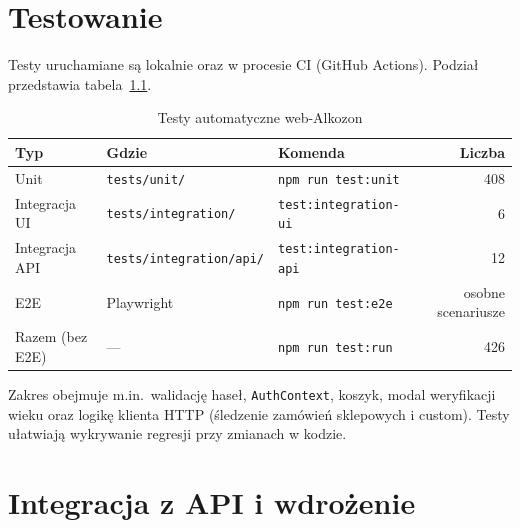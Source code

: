 \documentclass[12pt,a4paper]{report}
\newcommand{\blok}[1]{\needspace{9\baselineskip}#1}
\newcommand{\tabela}[1]{\needspace{11\baselineskip}#1}
\begin{document}
\FloatBarrier

\chapter{Testowanie}

\blok{%
Testy uruchamiane są lokalnie oraz w procesie CI (GitHub Actions). Podział przedstawia tabela~\ref{tab:tests}.
}

\tabela{%
\begin{table}[H]
  \centering
  \caption{Testy automatyczne web-Alkozon}
  \label{tab:tests}
  \begin{tabular}{@{}lllr@{}}
    \toprule
    \textbf{Typ} & \textbf{Gdzie} & \textbf{Komenda} & \textbf{Liczba} \\
    \midrule
    Unit & \texttt{tests/unit/} & \texttt{npm run test:unit} & 408 \\
    Integracja UI & \texttt{tests/integration/} & \texttt{test:integration-ui} & 6 \\
    Integracja API & \texttt{tests/integration/api/} & \texttt{test:integration-api} & 12 \\
    E2E & Playwright & \texttt{npm run test:e2e} & osobne scenariusze \\
    Razem (bez E2E) & --- & \texttt{npm run test:run} & 426 \\
    \bottomrule
  \end{tabular}
\end{table}
}

Zakres obejmuje m.in.\ walidację haseł, \texttt{AuthContext}, koszyk, modal weryfikacji wieku oraz logikę klienta HTTP (śledzenie zamówień sklepowych i custom). Testy ułatwiają wykrywanie regresji przy zmianach w kodzie.

\chapter{Integracja z API i wdrożenie}
\end{document}

